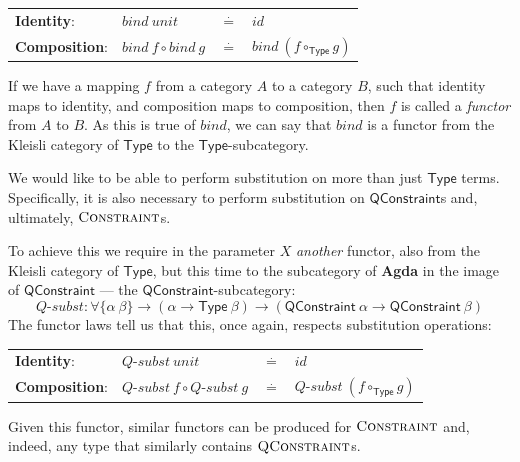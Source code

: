\documentclass[a4paper]{jfp}
\begin{document}
\begin{tabular}{llll}
      \textbf{Identity}: & $\mathit{bind}\ \mathit{unit} $&$\stackrel{\cdot}{=}$&$ \mathit{id}$\\
      \textbf{Composition}:& $\mathit{bind}\ f \circ \mathit{bind}\ g $&$\stackrel{\cdot}{=}$&$ \mathit{bind}\ (f \circ_\textsf{Type} g)$\\
\end{tabular}

If we have a mapping $f$ from a category $A$ to a category $B$, such that identity maps to identity, and composition maps to composition, 
then $f$ is called a \emph{functor} from $A$ to $B$. As this is true of $\mathit{bind}$, we can say that $\mathit{bind}$ is a functor from the Kleisli
category of $\textsf{Type}$ to the $\textsf{Type}$-subcategory. 

We would like to be able to perform substitution on more than just $\mathsf{Type}$ terms. Specifically, it is also necessary to perform 
substitution on $\mathsf{QConstraint}$s and, ultimately, $\textsc{Constraint}$s.

To achieve this we require in the parameter $X$ \emph{another} functor, also from the Kleisli category of $\textsf{Type}$, but this time to the 
subcategory of \textbf{Agda} in the image of $\textsf{QConstraint}$ --- the $\textsf{QConstraint}$-subcategory: 
\begin{displaymath}
   \textit{Q-subst} : \forall \{ \alpha\ \beta \} \rightarrow (\alpha \rightarrow \textsf{Type}\ \beta) \rightarrow (\textsf{QConstraint}\ \alpha \rightarrow \textsf{QConstraint}\ \beta)
\end{displaymath}
The functor laws tell us that this, once again, respects substitution operations:

\begin{tabular}{llll}
      \textbf{Identity}: & $\textit{Q-subst}\ \mathit{unit} $&$\stackrel{\cdot}{=}$&$ \mathit{id}$\\
      \textbf{Composition}:& $\textit{Q-subst}\ f \circ \textit{Q-subst}\ g $&$\stackrel{\cdot}{=}$&$ \textit{Q-subst}\ (f \circ_\textsf{Type} g)$\\
\end{tabular}

Given this functor, similar functors can be produced for $\textsc{Constraint}$ and, indeed, any type that similarly contains $\textsc{QConstraint}$s.
\end{document}
